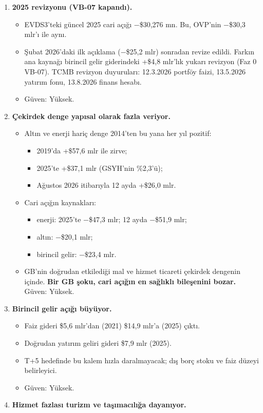 \begin{enumerate}
\def\labelenumi{\arabic{enumi}.}
\tightlist
\item
  \textbf{2025 revizyonu (VB-07 kapandı).}

  \begin{itemize}
  \tightlist
  \item
    EVDS3'teki güncel 2025 cari açığı −\$30,276 mn. Bu, OVP'nin −\$30,3 mlr'ı ile aynı.
  \item
    Şubat 2026'daki ilk açıklama (−\$25,2 mlr) sonradan revize edildi. Farkın ana kaynağı birincil gelir giderindeki +\$4,8 mlr'lık yukarı revizyon (Faz 0 VB-07). TCMB revizyon duyuruları: 12.3.2026 portföy faizi, 13.5.2026 yatırım fonu, 13.8.2026 finans hesabı.
  \item
    \etiketV{} Güven: Yüksek.
  \end{itemize}
\item
  \textbf{Çekirdek denge yapısal olarak fazla veriyor.}

  \begin{itemize}
  \tightlist
  \item
    Altın ve enerji hariç denge 2014'ten bu yana her yıl pozitif:

    \begin{itemize}
    \tightlist
    \item
      2019'da +\$57,6 mlr ile zirve;
    \item
      2025'te +\$37,1 mlr (GSYH'nin \%2,3'ü);
    \item
      Ağustos 2026 itibarıyla 12 ayda +\$26,0 mlr.
    \end{itemize}
  \item
    Cari açığın kaynakları:

    \begin{itemize}
    \tightlist
    \item
      enerji: 2025'te −\$47,3 mlr; 12 ayda −\$51,9 mlr;
    \item
      altın: −\$20,1 mlr;
    \item
      birincil gelir: −\$23,4 mlr.
    \end{itemize}
  \item
    GB'nin doğrudan etkilediği mal ve hizmet ticareti çekirdek dengenin içinde. \textbf{Bir GB şoku, cari açığın en sağlıklı bileşenini bozar.} \etiketV{} Güven: Yüksek.
  \end{itemize}
\item
  \textbf{Birincil gelir açığı büyüyor.}

  \begin{itemize}
  \tightlist
  \item
    Faiz gideri \$5,6 mlr'dan (2021) \$14,9 mlr'a (2025) çıktı.
  \item
    Doğrudan yatırım geliri gideri \$7,9 mlr (2025).
  \item
    T+5 hedefinde bu kalem hızla daralmayacak; dış borç stoku ve faiz düzeyi belirleyici.
  \item
    \etiketV{} Güven: Yüksek.
  \end{itemize}
\item
  \textbf{Hizmet fazlası turizm ve taşımacılığa dayanıyor.}


\end{enumerate}
